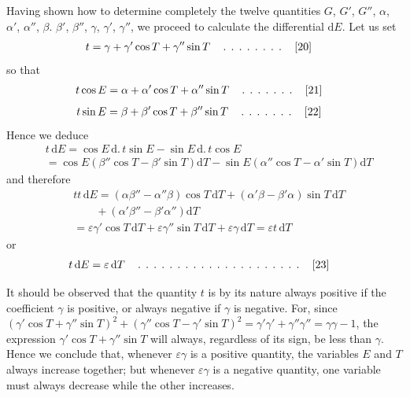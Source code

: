 \begingroup
\renewcommand{\arraystretch}{1.45}

Having shown how to determine completely the twelve quantities $G$, $G'$, $G''$, $\alpha$, $\alpha'$, $\alpha''$, $\beta$. $\beta'$, $\beta''$, $\gamma$, $\gamma'$, $\gamma''$, we proceed to calculate the differential $\mathrm dE$. Let us set
\[
\begin{aligned}
&t=\gamma+\gamma'\cos T+\gamma''\sin T\quad
\mathinner{\ldotp\;\ldotp\;\ldotp\;\ldotp\;\ldotp\;\ldotp\;\ldotp\;\ldotp}\quad[20]
\end{aligned}
\]
so that
\[
\begin{aligned}
&t\cos E=\alpha+\alpha'\cos T+\alpha''\sin T\quad
\mathinner{\ldotp\;\ldotp\;\ldotp\;\ldotp\;\ldotp\;\ldotp\;\ldotp}\quad[21]
\end{aligned}
\]
\[
\begin{aligned}
&t\sin E=\beta+\beta'\cos T+\beta''\sin T\quad
\mathinner{\ldotp\;\ldotp\;\ldotp\;\ldotp\;\ldotp\;\ldotp\;\ldotp}\quad[22]
\end{aligned}
\]
Hence we deduce
\[
\begin{aligned}
&t\,\mathrm dE=\cos E\,\mathrm d.\,t\sin E-\sin E\,\mathrm d.\,t\cos E\\[8pt]
&=\cos E(\beta''\cos T-\beta'\sin T)\mathrm dT
-\sin E(\alpha''\cos T-\alpha'\sin T)\mathrm dT
\end{aligned}
\]
and therefore
\[
\begin{aligned}
&tt\,\mathrm dE=(\alpha\beta''-\alpha''\beta)\cos T\,\mathrm dT
+(\alpha'\beta-\beta'\alpha)\sin T\,\mathrm dT
\\[6pt]
&\qquad{}+(\alpha'\beta''-\beta'\alpha'')\mathrm dT\\[8pt]
&=\varepsilon\gamma'\cos T\,\mathrm dT
+\varepsilon\gamma''\sin T\,\mathrm dT
+\varepsilon\gamma\,\mathrm dT=\varepsilon t\,\mathrm dT
\end{aligned}
\]
or
\[
\begin{aligned}
&t\,\mathrm dE{}=\varepsilon\,\mathrm dT\quad
\mathinner{\ldotp\;\ldotp\;\ldotp\;\ldotp\;\ldotp\;\ldotp\;\ldotp\;\ldotp\;\ldotp\;\ldotp\;\ldotp\;\ldotp\;\ldotp\;\ldotp\;\ldotp\;\ldotp\;\ldotp\;\ldotp\;\ldotp\;\ldotp\;\ldotp}\quad[23]
\end{aligned}
\]
\par It should be observed that the quantity $t$ is by its nature always positive if the coefficient $\gamma$ is positive, or always negative if $\gamma$ is negative. For, since
$(\gamma'\cos T+\gamma''\sin T)^2+(\gamma''\cos T-\gamma'\sin T)^2=\gamma'\gamma'+\gamma''\gamma''=\gamma\gamma-1$, the expression
\noindent{}
$\gamma'\cos T+\gamma''\sin T$ will always, regardless of its sign, be less than $\gamma$. Hence we conclude that, whenever $\varepsilon\gamma$ is a positive quantity, the variables $E$ and $T$ always increase together; but whenever $\varepsilon\gamma$ is a negative quantity, one variable must always decrease while the other increases.

